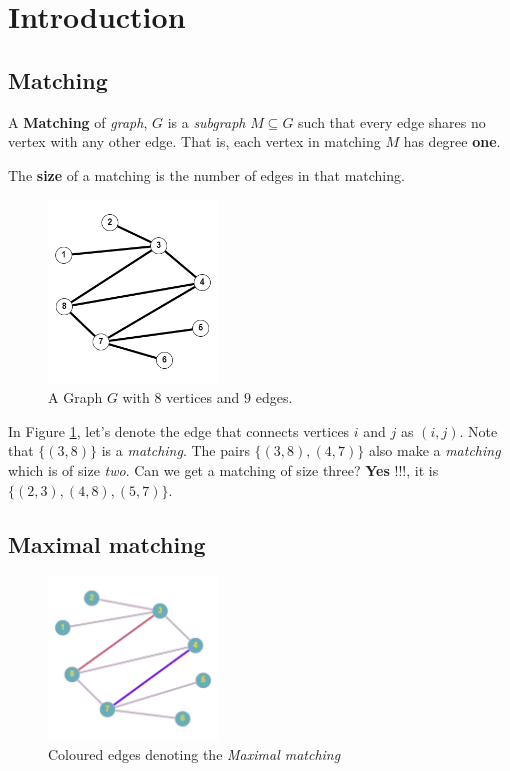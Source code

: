 \section{Introduction}

\subsection{Matching}

    A \textbf{Matching} of \textit{graph}, $G$ is a \textit{subgraph} $M \subseteq G$ such that every edge shares no vertex with any other edge. That is, each vertex in matching $M$ has  degree \textbf{one}.
     
    The \textbf{size} of a matching is the number of edges in that matching.

\begin{figure}[ht]
    \begin{center}
  \includegraphics[width=0.4\textwidth]{IMAGES_FIGS/FIG_1_1.png}
  \caption{A Graph $G$ with $8$ vertices and $9$ edges.}
  \label{FIG_1_1}
  \end{center}
  
\end{figure}

In Figure \ref{FIG_1_1}, let's denote the edge that connects vertices $i$ and $j$ as $(i, j)$. Note that $\{(3, 8)\}$ is a \textit{matching}. The pairs $\{(3, 8),(4, 7)\}$ also make a \textit{matching} which is of size \textit{two}. Can we get a matching of size three? \textbf{Yes} !!!, it is $\{(2, 3),(4, 8),(5, 7)\}$. 


\subsection{Maximal matching}
    \begin{figure}[ht]
    \begin{center}
  \includegraphics[width=0.4\textwidth]{IMAGES_FIGS/FIG_1_2.png}
  \caption{Coloured edges denoting the \textit{Maximal matching}}
  \label{FIG_1_2}
  \end{center}
  
\end{figure}

